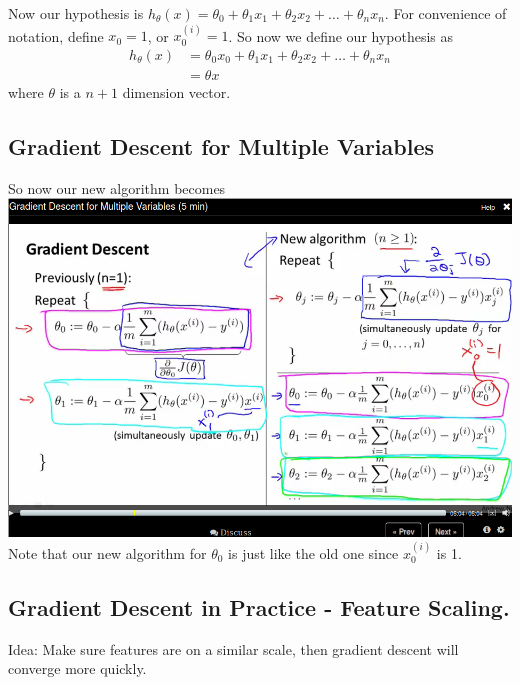 \documentclass[11pt]{article}
\begin{document}
Now our hypothesis is \(h_\theta (x) = \theta_0 + \theta_1 x_1 +  \theta_2 x_2 + \dots + \theta_n x_n \).
For convenience of notation, define \(x_0 = 1\), or \(x^{(i)}_0 = 1\). So now we define our hypothesis as
\begin{equation*}
\begin{split}
h_\theta (x) &= \theta_0 x_0 + \theta_1 x_1 +  \theta_2 x_2 + \dots + \theta_n x_n \\
&= \theta x
\end{split}
\end{equation*}
where \(\theta\) is a \(n+1\) dimension vector.
\subsection*{Gradient Descent for Multiple Variables}
\label{sec-5-2}
So now our new algorithm becomes
\includegraphics[width=.9\linewidth]{./images/screenshot-14.png}
Note that our new algorithm for $\theta_0$ is just like the old one since \(x_0^{(i)} \) is 1.
\subsection*{Gradient Descent in Practice - Feature Scaling.}
\label{sec-5-3}
Idea: Make sure features are on a similar scale, then gradient descent will converge more quickly.
\end{document}
